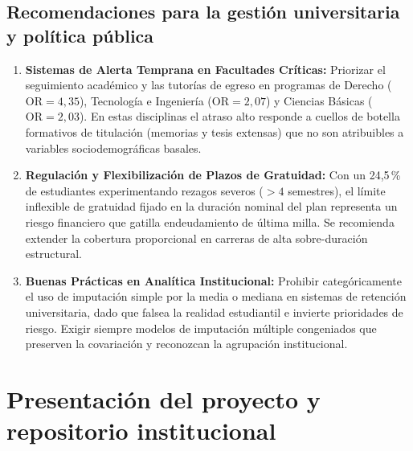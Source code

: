 \documentclass[11pt,a4paper]{article}
\begin{document}
\subsection{Recomendaciones para la gestión universitaria y política pública}
\begin{enumerate}[leftmargin=*]
\item \textbf{Sistemas de Alerta Temprana en Facultades Críticas:} Priorizar el seguimiento académico y las tutorías de egreso en programas de Derecho ($\text{OR} = 4,35$), Tecnología e Ingeniería ($\text{OR} = 2,07$) y Ciencias Básicas ($\text{OR} = 2,03$). En estas disciplinas el atraso alto responde a cuellos de botella formativos de titulación (memorias y tesis extensas) que no son atribuibles a variables sociodemográficas basales.
\item \textbf{Regulación y Flexibilización de Plazos de Gratuidad:} Con un 24,5\,\% de estudiantes experimentando rezagos severos ($>4$ semestres), el límite inflexible de gratuidad fijado en la duración nominal del plan representa un riesgo financiero que gatilla endeudamiento de última milla. Se recomienda extender la cobertura proporcional en carreras de alta sobre-duración estructural.
\item \textbf{Buenas Prácticas en Analítica Institucional:} Prohibir categóricamente el uso de imputación simple por la media o mediana en sistemas de retención universitaria, dado que falsea la realidad estudiantil e invierte prioridades de riesgo. Exigir siempre modelos de imputación múltiple congeniados que preserven la covariación y reconozcan la agrupación institucional.
\end{enumerate}

\section{Presentación del proyecto y repositorio institucional}
\end{document}
